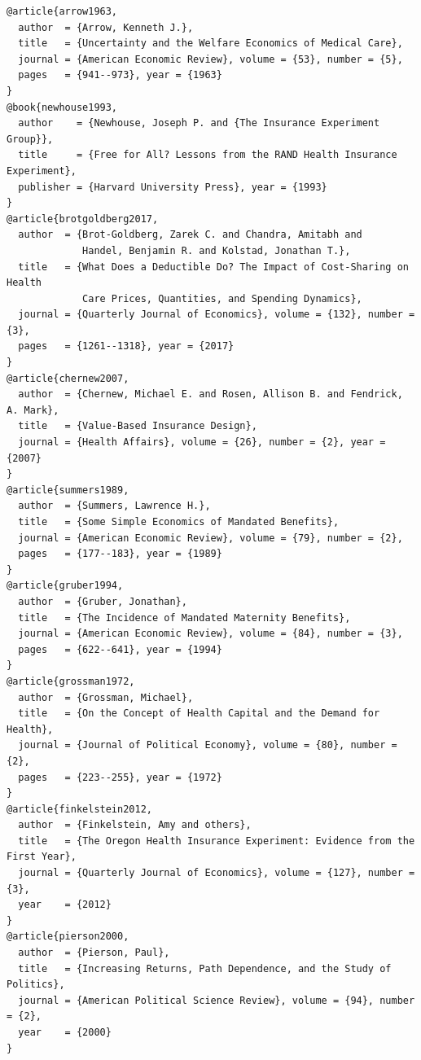 \documentclass[11pt,a4paper]{article}
\begin{document}
{\small
\begin{verbatim}
@article{arrow1963,
  author  = {Arrow, Kenneth J.},
  title   = {Uncertainty and the Welfare Economics of Medical Care},
  journal = {American Economic Review}, volume = {53}, number = {5},
  pages   = {941--973}, year = {1963}
}
@book{newhouse1993,
  author    = {Newhouse, Joseph P. and {The Insurance Experiment Group}},
  title     = {Free for All? Lessons from the RAND Health Insurance Experiment},
  publisher = {Harvard University Press}, year = {1993}
}
@article{brotgoldberg2017,
  author  = {Brot-Goldberg, Zarek C. and Chandra, Amitabh and
             Handel, Benjamin R. and Kolstad, Jonathan T.},
  title   = {What Does a Deductible Do? The Impact of Cost-Sharing on Health
             Care Prices, Quantities, and Spending Dynamics},
  journal = {Quarterly Journal of Economics}, volume = {132}, number = {3},
  pages   = {1261--1318}, year = {2017}
}
@article{chernew2007,
  author  = {Chernew, Michael E. and Rosen, Allison B. and Fendrick, A. Mark},
  title   = {Value-Based Insurance Design},
  journal = {Health Affairs}, volume = {26}, number = {2}, year = {2007}
}
@article{summers1989,
  author  = {Summers, Lawrence H.},
  title   = {Some Simple Economics of Mandated Benefits},
  journal = {American Economic Review}, volume = {79}, number = {2},
  pages   = {177--183}, year = {1989}
}
@article{gruber1994,
  author  = {Gruber, Jonathan},
  title   = {The Incidence of Mandated Maternity Benefits},
  journal = {American Economic Review}, volume = {84}, number = {3},
  pages   = {622--641}, year = {1994}
}
@article{grossman1972,
  author  = {Grossman, Michael},
  title   = {On the Concept of Health Capital and the Demand for Health},
  journal = {Journal of Political Economy}, volume = {80}, number = {2},
  pages   = {223--255}, year = {1972}
}
@article{finkelstein2012,
  author  = {Finkelstein, Amy and others},
  title   = {The Oregon Health Insurance Experiment: Evidence from the First Year},
  journal = {Quarterly Journal of Economics}, volume = {127}, number = {3},
  year    = {2012}
}
@article{pierson2000,
  author  = {Pierson, Paul},
  title   = {Increasing Returns, Path Dependence, and the Study of Politics},
  journal = {American Political Science Review}, volume = {94}, number = {2},
  year    = {2000}
}
\end{verbatim}
}
\end{document}
